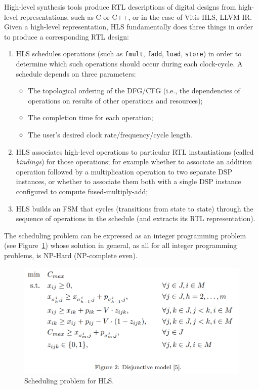 High-level synthesis tools produce RTL descriptions of digital designs from high-level representations, such as C or C++\cite{10.1145/2514740, ferrandi2021bambu}, or in the case of Vitis HLS, LLVM IR.
Given a high-level representation, HLS fundamentally does three things in order to produce a corresponding RTL design:
\begin{enumerate}
	\item HLS schedules operations (such as \texttt{fmult}, \texttt{fadd}, \texttt{load}, \texttt{store}) in order to determine which such operations should occur during each clock-cycle. A schedule depends on three parameters:
	      \begin{itemize}
		      \item The topological ordering of the DFG/CFG (i.e., the dependencies of operations on results of other operations and resources);
		      \item The completion time for each operation;
		      \item The user's desired clock rate/frequency/cycle length.
	      \end{itemize}
	\item HLS associates high-level operations to particular RTL instantiations (called \emph{bindings}) for those operations;
	for example whether to associate an addition operation followed by a multiplication operation to two separate DSP instances, or whether to associate them both with a single DSP instance configured to compute fused-multiply-add;
	\item HLS builds an FSM that cycles (transitions from state to state) through the sequence of operations in the schedule (and extracts its RTL representation).
\end{enumerate}
The scheduling problem can be expressed as an integer programming problem\cite{tuprints9272} (see Figure~\ref{fig:schedule}) whose solution in general, as all for all integer programming problems, is NP-Hard (NP-complete even).
\begin{figure}[H]
	\includegraphics[width=\columnwidth]{figures/schedule}
	\caption{Scheduling problem for HLS.}
	\label{fig:schedule}
\end{figure}
